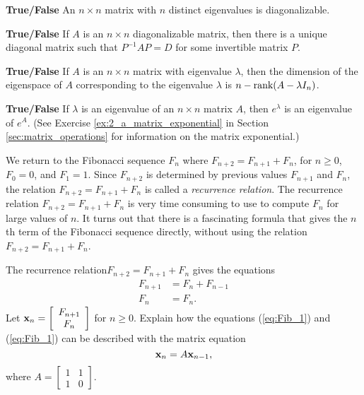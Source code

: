 \item \textbf{True/False} An $n\times n$ matrix with $n$ distinct eigenvalues is diagonalizable.

\item \textbf{True/False} If $A$ is an $n\times n$ diagonalizable matrix, then there is a unique diagonal matrix such that $P^{-1}AP = D$ for some invertible matrix $P$.  

\item \textbf{True/False} If $A$ is an $n\times n$ matrix with eigenvalue $\lambda$, then the dimension of the eigenspace of $A$ corresponding to the eigenvalue $\lambda$ is $n - \text{rank}(A - \lambda I_n)$. 

\item \textbf{True/False} If $\lambda$ is an eigenvalue of an $n \times n$ matrix $A$, then $e^\lambda$ is an eigenvalue of $e^A$. (See Exercise  \ref{ex:2_a_matrix_exponential} in Section \ref{sec:matrix_operations} for information on the matrix exponential.)

\ea
\ee


We return to the Fibonacci sequence $F_n$ where $F_{n+2} = F_{n+1} + F_{n}$, for $n \geq 0$, $F_0 = 0$, and $F_1=1$. Since $F_{n+2}$ is determined by previous values $F_{n+1}$ and $F_n$, the relation $F_{n+2} = F_{n+1} + F_{n}$ is called a \emph{recurrence relation}. The recurrence relation $F_{n+2} = F_{n+1} + F_{n}$ is very time consuming to use to compute $F_n$ for large values of $n$. It turns out that there is a fascinating formula that gives the $n$th term of the Fibonacci sequence directly, without using the relation $F_{n+2} = F_{n+1} + F_{n}$.


\begin{pactivity} The recurrence relation$F_{n+2} = F_{n+1} + F_{n}$ gives the equations
\begin{align}
F_{n+1} &= F_{n} + F_{n-1} \label{eq:Fib_1} \\
F_{n} &= F_{n}. \label{eq:Fib_2} 
\end{align} 
Let $\mathbf{x}_{n} = \left[ \begin{array}{c} F_{n+1} \\ F_{n} \end{array} \right]$ for $n \geq 0$. Explain how the equations (\ref{eq:Fib_1}) and (\ref{eq:Fib_1}) can be described with the matrix equation
\begin{equation} \label{eq:Fib_matrix}
\mathbf{x}_n = A \mathbf{x}_{n-1},
\end{equation}
where $A = \left[ \begin{array}{cc} 1&1 \\ 1&0 \end{array} \right]$. 

\end{pactivity}


